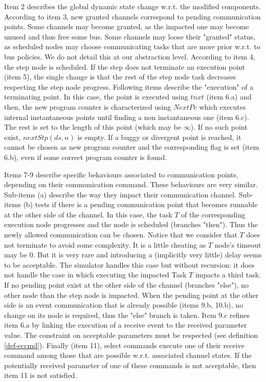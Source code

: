 \documentclass{article}
\begin{document}
Item 2 describes the global dynamic state change w.r.t. the modified components. According to item 3, new granted channels correspond to pending communication points. Some channels may become granted, as the impacted one may become unused and thus free some bus. Some channels may loose their "granted" status, as scheduled nodes may choose communicating tasks that are more prior w.r.t. to bus policies. We do not detail this at our abstraction level. According to item 4, the step node is scheduled. If the step does not terminate an execution point (item 5), the single change is that the rest of the step node task decreases respecting the step node progress. Following items describe the "execution" of a terminating point. In this case, the point is executed using $tnxt$ (item 6.a) and then, the new program counter is characterized using $NextPc$ which executes internal instantaneous points until finding a non instantaneous one (item 6.c). The rest is set to the length of this point (which may be $\infty$). If no such point exist, $nextStp(ds,n)$ is empty. If a buggy or divergent point is reached, it cannot be chosen as new program counter and the corresponding flag is set (item 6.b), even if some correct program counter is found. 

Items 7-9 describe specific behaviours associated to communication points, depending on their communi\-cation command. These behaviours are very similar. Sub-items (a) describe the way they impact their communication channel. Sub-items (b) tests if there is a pending communication point that becomes runnable at the other side of the channel. In this case, the task $T$ of the corresponding execution node progresses and the node is scheduled (branches "then"). Thus the newly allowed communication can be chosen. Notice that we consider that $T$ does not terminate to avoid some complexity. It is a little cheating as $T$ node's timeout may be 0. But it is very rare and introducing a (implicitly very little) delay seems to be acceptable. The simulator handles this case but without recursion: it does not handle the case in which executing the impacted Task $T$ impacts a third task. If no pending point exist at the other side of the channel (branches "else"), no other node than the step node is impacted. When the pending point at the other side is an event communication that is already possible (items 9.b, 10.b), no change on its node is required, thus the "else" branch is taken. Item 9.c refines item 6.a by linking the execution of a receive event to the received parameter value. The constraint on acceptable parameters must be respected (see definition \ref{def-eccmd}). Finally (item 11), select commands execute one of their receive command among those that are possible w.r.t. associated channel states. If the potentially received parameter of one of these commands is not acceptable, then item 11 is not satisfied.
\end{document}
